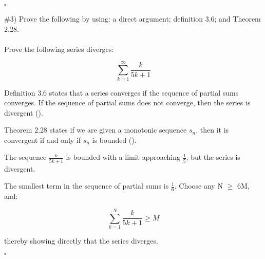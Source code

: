 \documentclass[11pt]{article}
\begin{document}
$\square$

\#3) Prove the following by using: a direct argument; definition 3.6; and Theorem 2.28.

\paragraph{}

Prove the following series diverges:

\begin{equation}
	\sum_{k=1}^{\infty}\frac{k}{5k+1}
\end{equation}

Definition 3.6 states that a series converges if the sequence of partial sums converges.
If the sequence of partial sums does not converge, then the series is divergent (\cite{tbb}).

Theorem 2.28 states if we are given a monotonic sequence ${s_n}$, then it is convergent if and only if ${s_n}$ is bounded (\cite{tbb}).

The sequence $\frac{k}{5k+1}$ is bounded with a limit approaching $\frac{1}{5}$, but the series is divergent.

The smallest term in the sequence of partial sums is $\frac{1}{6}$.
Choose any N $\ge$ 6M, and:

\begin{equation}
	\sum_{k=1}^{N}\frac{k}{5k+1} \ge M
\end{equation}

thereby showing directly that the series diverges.

$\square$

\printbibliography
\end{document}
